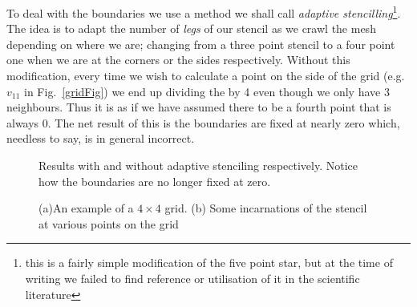 \documentclass[a4paper]{article}
\begin{document}
To deal with the boundaries we use a method we shall call \emph{adaptive
stencilling}\footnote{this is a fairly simple modification of the five point
star, but at the time of writing we failed to find reference or utilisation of
it in the scientific literature}. The idea is to adapt the number of
\emph{legs} of our stencil as we crawl the mesh depending on where we are;
changing from a three point stencil to a four point one when we are at the
corners or the sides respectively. Without this modification, every time we
wish to calculate a point on the side of the grid (e.g. $v_{11}$ in
Fig.~\ref{gridFig}) we end up dividing the by 4 even though we only have 3
neighbours. Thus it is as if we have assumed there to be a fourth point that is
always 0. The net result of this is the boundaries are fixed at nearly zero
which, needless to say, is in general incorrect.
\begin{figure}[!h]
  \centering
  \hfill
  \caption{Results with and without adaptive stenciling respectively. Notice how the boundaries are no longer fixed at zero.}
\end{figure}
\begin{figure}[!h]
  \centering
  \hfill
  \caption{(a)An example of a $4 \times 4$ grid. (b) Some incarnations of the stencil at various points on the grid}
\end{figure}
\end{document}
